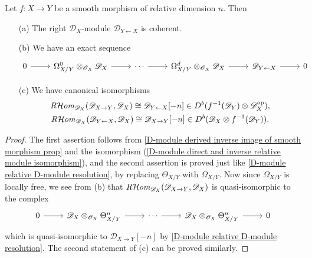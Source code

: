 \begin{proposition}\label{D-module smooth morphism relative direct module prop}
Let $f:X\to Y$ be a smooth morphism of relative dimension $n$. Then 
\begin{enumerate}
    \item[(a)] The right $\mathscr{D}_X$-module $\mathscr{D}_{Y\leftarrow X}$ is coherent.
    \item[(b)] We have an exact sequence
    \[\begin{tikzcd}
    0\ar[r]&\Omega_{X/Y}^0\otimes_{\mathscr{O}_X}\mathscr{D}_X\ar[r]&\cdots\ar[r]&\Omega_{X/Y}^d\otimes_{\mathscr{O}_X}\mathscr{D}_X\ar[r]&\mathscr{D}_{Y\leftarrow X}\ar[r]&0
    \end{tikzcd}\]
    \item[(c)] We have canonical isomorphisms
    \begin{gather*}
    R\!\operatorname{\mathcal{H}\hspace*{-0.4pt}\textit{om}\hspace{0.5pt}}_{\mathscr{D}_X}(\mathscr{D}_{X\to Y},\mathscr{D}_X)\cong \mathscr{D}_{Y\leftarrow X}[-n]\in D^b(f^{-1}(\mathscr{D}_Y)\otimes\mathscr{D}_X^{\mathrm{op}}),\\
    R\!\operatorname{\mathcal{H}\hspace*{-0.4pt}\textit{om}\hspace{0.5pt}}_{\mathscr{D}_X}(\mathscr{D}_{Y\leftarrow X},\mathscr{D}_X)\cong \mathscr{D}_{X\to Y}[-n]\in D^b(\mathscr{D}_X\otimes f^{-1}(\mathscr{D}_Y)).
    \end{gather*}
\end{enumerate}
\end{proposition}
\begin{proof}
The first assertion follows from \cref{D-module derived inverse image of smooth morphism prop} and the isomorphism (\ref{D-module direct and inverse relative module isomorphism}), and the second assertion is proved just like \cref{D-module relative D-module resolution}, by replacing $\Theta_{X/Y}$ with $\Omega_{X/Y}$. Now since $\Omega_{X/Y}$ is locally free, we see from (b) that $R\!\operatorname{\mathcal{H}\hspace*{-0.4pt}\textit{om}\hspace{0.5pt}}_{\mathscr{D}_X}(\mathscr{D}_{X\to Y},\mathscr{D}_X)$ is quasi-isomorphic to the complex
\[\begin{tikzcd}
0\ar[r]&\mathscr{D}_X\otimes_{\mathscr{O}_X}\Theta_{X/Y}^n\ar[r]&\cdots\ar[r]&\mathscr{D}_X\otimes_{\mathscr{O}_X}\Theta_{X/Y}^n\ar[r]&0
\end{tikzcd}\]
which is quasi-isomorphic to $\mathscr{D}_{X\to Y}[-n]$ by \cref{D-module relative D-module resolution}. The second statement of (c) can be proved similarly.
\end{proof}

